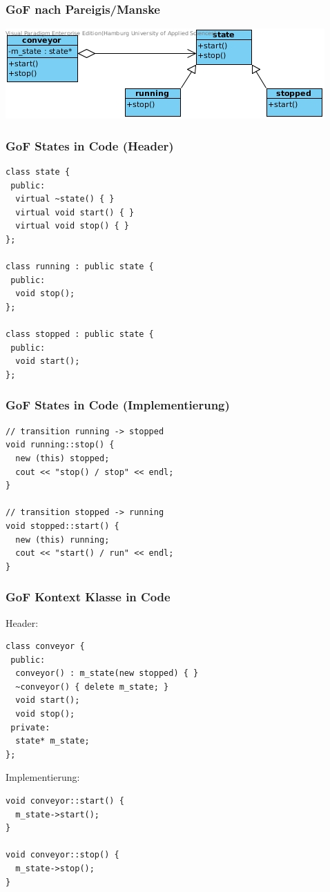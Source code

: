 \documentclass{beamer}
\begin{document}
\begin{frame}
 \frametitle{GoF nach Pareigis/Manske}
 \includegraphics[scale=.6]{img/fsm_gof.jpg}
\end{frame}

\begin{frame}[fragile]
 \frametitle{GoF States in Code (Header)}
 \begin{lstlisting}
class state {
 public:
  virtual ~state() { }
  virtual void start() { }
  virtual void stop() { }
};

class running : public state {
 public:
  void stop();
};

class stopped : public state {
 public:
  void start();
};
 \end{lstlisting}
\end{frame}

\begin{frame}[fragile]
 \frametitle{GoF States in Code (Implementierung)}
 \begin{lstlisting}
// transition running -> stopped
void running::stop() {
  new (this) stopped;
  cout << "stop() / stop" << endl;
}

// transition stopped -> running
void stopped::start() {
  new (this) running;
  cout << "start() / run" << endl;
}
 \end{lstlisting}
\end{frame}

\begin{frame}[fragile]
 \frametitle{GoF Kontext Klasse in Code}
 Header:
 \begin{lstlisting}
class conveyor {
 public:
  conveyor() : m_state(new stopped) { }
  ~conveyor() { delete m_state; }
  void start();
  void stop();
 private:
  state* m_state;
};
 \end{lstlisting}
 Implementierung:
 \begin{lstlisting}
void conveyor::start() {
  m_state->start();
}

void conveyor::stop() {
  m_state->stop();
}
 \end{lstlisting}
\end{frame}
\end{document}
